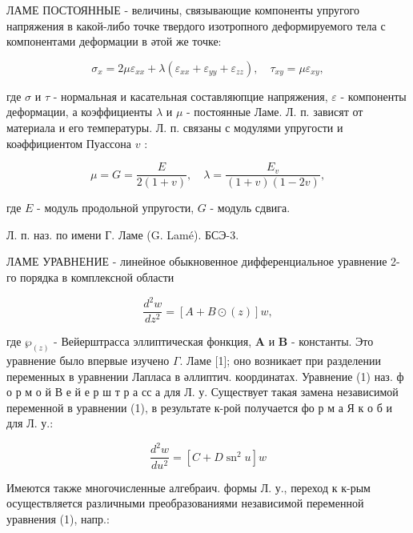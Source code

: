 \documentclass[10pt]{article}
\begin{document}
ЛАМЕ ПОСТОЯННЫЕ - величины, связывающие компоненты упругого напряжения в какой-либо точке твердого изотропного деформируемого тела с компонентами деформации в әтой же точке:



\[

\sigma_{x}=2 \mu \varepsilon_{x x}+\lambda\left(\varepsilon_{x x}+\varepsilon_{y y}+\varepsilon_{z z}\right), \quad \tau_{x y}=\mu \varepsilon_{x y},

\]



где $\sigma$ и $\tau$ - нормальная и касательная составляюпцие напряжения, $\varepsilon$ - компоненты деформации, а коэффициенты $\lambda$ и $\mu$ - постоянные Ламе. Л. п. зависят от материала и его температуры. Л. п. связаны с модулями упругости и коәффициентом Пуассона $v$ :



\[

\mu=G=\frac{E}{2(1+v)}, \quad \lambda=\frac{E_{v}}{(1+v)(1-2 v)},

\]



где $E$ - модуль продольной упругости, $G$ - модуль сдвига.



Л. п. наз. по имени Г. Ламе (G. Lamé). БСЭ-3.



ЛАМЕ УРАВНЕНИЕ - линейное обыкновенное дифференциальное уравнение 2-го порядка в комплексной области



\[

\frac{d^{2} w}{d z^{2}}=[A+B \odot(z)] w,

\]



где $\wp_{(z)}$ - Вейерштрасса эллиптическая фонкция, $\boldsymbol{A}$ и $\boldsymbol{B}$ - константы. Это уравнение было впервые изучено $\Gamma$. Ламе [1]; оно возникает при разделении переменных в уравнении Лапласа в әллиптич. координатах. Уравнение (1) наз. ф о р м о й В е й е р ш т р а сс а для Л. у. Существует такая замена независимой переменной в уравнении (1), в результате к-рой получается фо р м а Я к о б и для Л. у.:



\[

\frac{d^{2} w}{d u^{2}}=\left[C+D \operatorname{sn}^{2} u\right] w

\]



Имеются также многочисленные алгебраич. формы Л. у., переход к к-рым осуществляется различными преобразованиями независимой переменной уравнения (1), напр.:
\end{document}
